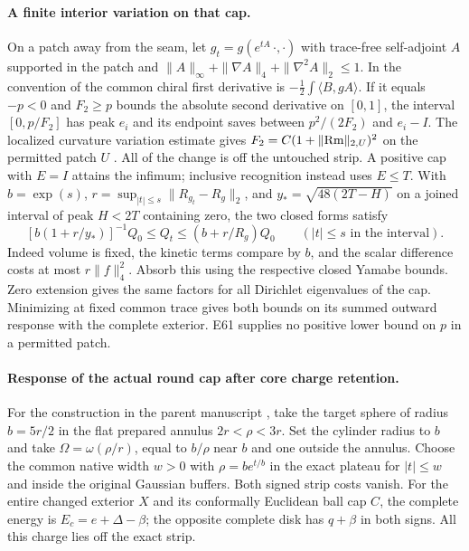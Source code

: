 \documentclass[11pt,letterpaper]{article}
\numberwithin{equation}{section}
\begin{document}
\paragraph{A finite interior variation on that cap.}
On a patch away from the seam, let
\(g_t=g(e^{tA}\,\cdot,\cdot)\) with trace-free self-adjoint \(A\)
supported in the patch and
\(\|A\|_\infty+\|\nabla A\|_4+\|\nabla^2 A\|_2\le1\).
In the convention of \cite{BahuaudGuentherIsenbergMazzeo2025Bach}
the common chiral first derivative is
\(-\tfrac12\int\langle B,gA\rangle\).
If it equals \(-p<0\) and \(F_2\ge p\) bounds the absolute second
derivative on \([0,1]\), the interval \([0,p/F_2]\) has peak \(e_i\)
and its endpoint saves between \(p^2/(2F_2)\) and \(e_i-I\).
The localized curvature variation estimate gives
\(F_2=C(1+\|{\rm Rm}\|_{2,U})^2\) on the permitted patch \(U\)
\cite{Baker2026FixedDescent}. All of the change is off the untouched
strip. A positive cap with \(E=I\) attains the infimum; inclusive
recognition instead uses \(E\le T\).
With \(b=\exp(s)\), \(r=\sup_{|t|\le s}\|R_{g_t}-R_g\|_2\), and
\(y_*=\sqrt{48(2T-H)}\) on a joined interval of peak \(H<2T\)
containing zero, the two closed forms satisfy
\[
 [b(1+r/y_*)]^{-1}Q_0\le Q_t\le(b+r/R_g)Q_0
 \qquad (|t|\le s\text{ in the interval}).
\]
Indeed volume is fixed, the kinetic terms compare by \(b\), and
the scalar difference costs at most \(r\|f\|_4^2\). Absorb this
using the respective closed Yamabe bounds. Zero extension gives
the same factors for all Dirichlet eigenvalues of the cap.
Minimizing at fixed common trace gives both bounds on its summed
outward response with the complete exterior. E61 supplies no positive
lower bound on \(p\) in a permitted patch.
\paragraph{Response of the actual round cap after core charge retention.}
For the construction in the parent manuscript
\cite{Baker2026CollarProgram}, take the target sphere of radius
\(b=5r/2\) in the flat prepared annulus \(2r<\rho<3r\).
Set the cylinder radius to \(b\) and take
\(\Omega=\omega(\rho/r)\), equal to \(b/\rho\) near \(b\) and
one outside the annulus. Choose the common native width \(w>0\)
with \(\rho=b e^{t/b}\) in the exact plateau for \(|t|\le w\)
and inside the original Gaussian buffers. Both signed strip
costs vanish. For the entire changed exterior \(X\) and its
conformally Euclidean ball cap \(C\), the complete energy is
\(E_c=e+\Delta-\beta\); the opposite complete disk has
\(q+\beta\) in both signs. All this charge lies off the exact strip.
\end{document}
